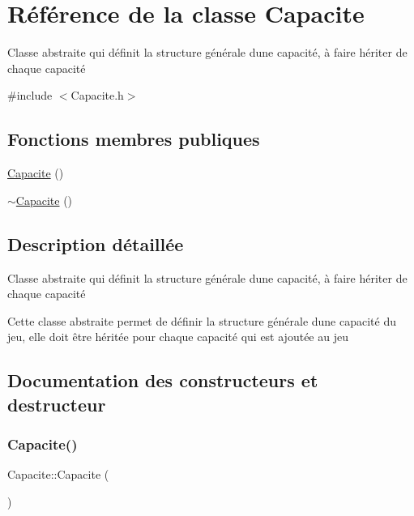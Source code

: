 \hypertarget{class_capacite}{}\section{Référence de la classe Capacite}
\label{class_capacite}


Classe abstraite qui définit la structure générale d\textquotesingle{}une capacité, à faire hériter de chaque capacité  




{\ttfamily \#include $<$Capacite.\+h$>$}

\subsection*{Fonctions membres publiques}
\begin{DoxyCompactItemize}
\item 
\hyperlink{class_capacite_a1c3b9e4e72d8d5494d1eb8ad15bb4d2a}{Capacite} ()
\item 
\hyperlink{class_capacite_a2224d62c03a73b7b34c0a5cb68c91279}{$\sim$\+Capacite} ()
\end{DoxyCompactItemize}


\subsection{Description détaillée}
Classe abstraite qui définit la structure générale d\textquotesingle{}une capacité, à faire hériter de chaque capacité 

Cette classe abstraite permet de définir la structure générale d\textquotesingle{}une capacité du jeu, elle doit être héritée pour chaque capacité qui est ajoutée au jeu 

\subsection{Documentation des constructeurs et destructeur}
\mbox{\label{class_capacite_a1c3b9e4e72d8d5494d1eb8ad15bb4d2a}} 
\subsubsection{\texorpdfstring{Capacite()}{Capacite()}}
{\footnotesize\ttfamily Capacite\+::\+Capacite (\begin{DoxyParamCaption}{ }\end{DoxyParamCaption})}

